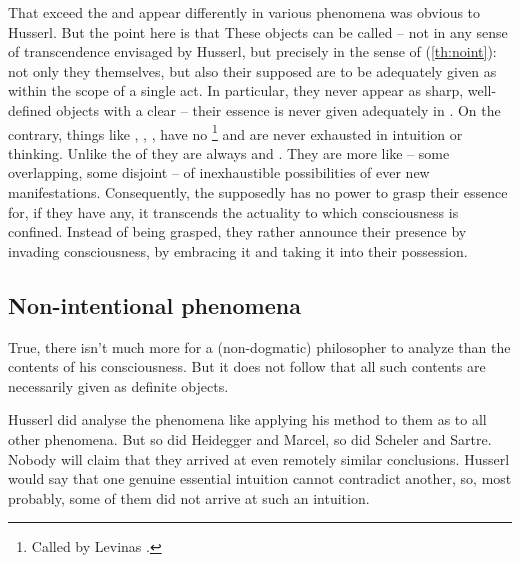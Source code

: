 That  exceed the  and appear
differently in various phenomena was obvious to Husserl. 
But the point here is that 
% 
These objects 
can be called  -- not in any 
sense of transcendence envisaged by Husserl, but precisely in the sense 
of (\ref{th:noint}): not only they themselves, but also their supposed 
 are  to be adequately given as  within the scope of a single act. In particular, they never appear 
as sharp, 
well-defined objects with a clear  -- their 
essence is never given adequately in . On the 
contrary, things like , , ,  have no 
\footnote{Called by Levinas .}
and are never exhausted in intuition or thinking. Unlike the
 of  they are always 
and . 
They are more like  -- some overlapping, some disjoint -- 
of inexhaustible possibilities of ever new manifestations.
Consequently, the supposedly  has 
no power to grasp their essence for, if they have any, it transcends 
the actuality to which consciousness is confined. Instead of being 
grasped, they rather announce their presence by invading 
consciousness, by embracing it and taking it into their possession.


\subsection{Non-intentional phenomena}

True, there isn't much more for a (non-dogmatic) philosopher to 
analyze than the contents of his consciousness. But it does not 
follow that all such contents are necessarily given as 
definite objects.

Husserl did analyse the phenomena like  applying his method 
to them as to all other phenomena. 
But so did Heidegger and Marcel, so did Scheler and Sartre. Nobody 
will claim that they arrived at even remotely similar conclusions. 
Husserl would say that one genuine essential intuition cannot 
contradict another, so, most probably, some of them did not arrive at 
such an intuition.

